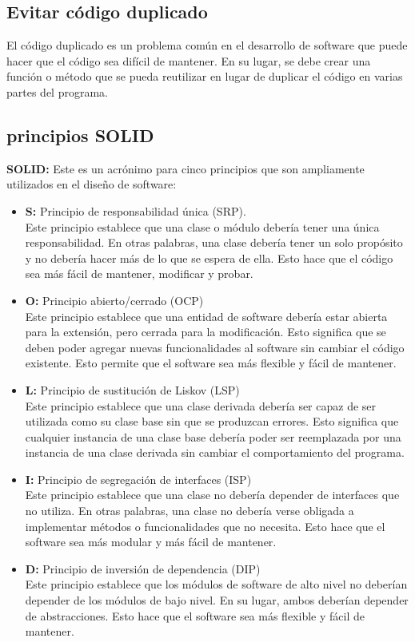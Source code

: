 \documentclass[executivepaper]{article}
\begin{document}
\subsection*{Evitar código duplicado}
El código duplicado es un problema común en el desarrollo de software que puede hacer que el código sea difícil de mantener. En su lugar, se debe crear una función o método que se pueda reutilizar en lugar de duplicar el código en varias partes del programa.

\newpage
\subsection{principios SOLID}
\textbf{SOLID:} Este es un acrónimo para cinco principios que son ampliamente utilizados en el diseño de software:

\begin{itemize}
\item \textbf{S:} Principio de responsabilidad única (SRP).\\
    Este principio establece que una clase o módulo debería tener una única responsabilidad. En otras palabras, una clase debería tener un solo propósito y no debería hacer más de lo que se espera de ella. Esto hace que el código sea más fácil de mantener, modificar y probar.

\item \textbf{O:} Principio abierto/cerrado (OCP)\\
    Este principio establece que una entidad de software debería estar abierta para la extensión, pero cerrada para la modificación. Esto significa que se deben poder agregar nuevas funcionalidades al software sin cambiar el código existente. Esto permite que el software sea más flexible y fácil de mantener.

\item \textbf{L:} Principio de sustitución de Liskov (LSP)\\ 
    Este principio establece que una clase derivada debería ser capaz de ser utilizada como su clase base sin que se produzcan errores. Esto significa que cualquier instancia de una clase base debería poder ser reemplazada por una instancia de una clase derivada sin cambiar el comportamiento del programa.

\item \textbf{I:} Principio de segregación de interfaces (ISP)\\
    Este principio establece que una clase no debería depender de interfaces que no utiliza. En otras palabras, una clase no debería verse obligada a implementar métodos o funcionalidades que no necesita. Esto hace que el software sea más modular y más fácil de mantener.
\item \textbf{D:} Principio de inversión de dependencia (DIP)\\
Este principio establece que los módulos de software de alto nivel no deberían depender de los módulos de bajo nivel. En su lugar, ambos deberían depender de abstracciones. Esto hace que el software sea más flexible y fácil de mantener.
\end{itemize}
\end{document}
